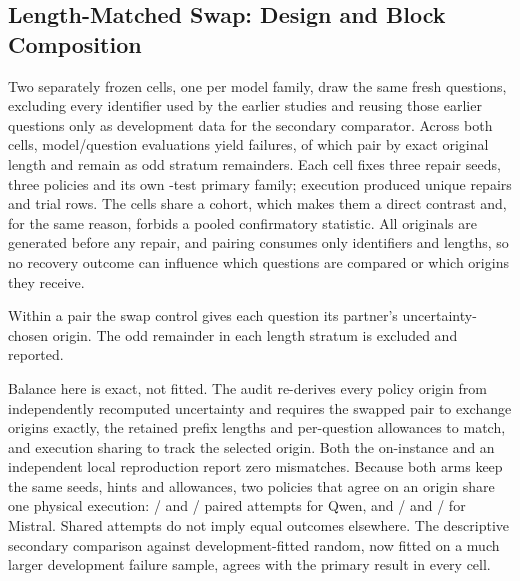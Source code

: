 \documentclass{article}
\begin{document}
\subsection{Length-Matched Swap: Design and Block Composition}
\label{app:position_pairs}
Two separately frozen cells, one per model family, draw the same \PairCohort{}
fresh questions, excluding every identifier used by the earlier studies and
reusing those earlier questions only as development data for the secondary
comparator. Across both cells, \PairQuestions{} model/question evaluations
yield \PairFailures{} failures, of which \PairMatched{} pair by exact original
length and \PairUnmatched{} remain as odd stratum remainders. Each cell fixes
three repair seeds, three policies and its own \PairFamily{}-test primary
family; execution produced \PairRepairs{} unique repairs and \PairRows{} trial
rows. The cells share a cohort, which makes them a direct contrast and, for the
same reason, forbids a pooled confirmatory statistic. All originals are
generated before any repair, and pairing consumes only identifiers and
lengths, so no recovery outcome can influence which questions are compared or
which origins they receive.

Within a pair the swap control gives each question its partner's
uncertainty-chosen origin. The odd remainder in each length stratum is
excluded and reported.

Balance here is exact, not fitted. The audit re-derives every policy origin
from independently recomputed uncertainty and requires the swapped pair to
exchange origins exactly, the retained prefix lengths and per-question
allowances to match, and execution sharing to track the selected origin. Both
the on-instance and an independent local reproduction report zero mismatches.
Because both arms keep the same seeds, hints and allowances, two policies that
agree on an origin share one physical execution:
\PairQwenHotpotShared{}/\PairQwenHotpotAttempts{} and
\PairQwenTwoWikiShared{}/\PairQwenTwoWikiAttempts{} paired attempts for Qwen,
and \PairMistralHotpotShared{}/\PairMistralHotpotAttempts{} and
\PairMistralTwoWikiShared{}/\PairMistralTwoWikiAttempts{} for Mistral. Shared
attempts do not imply equal outcomes elsewhere. The descriptive secondary
comparison against development-fitted random, now fitted on a much larger
development failure sample, agrees with the primary result in every cell.

\begin{table}[htbp]
\centering\footnotesize
\caption{Length-matched swap experiment, two model families on the same
\PairCohort{} fresh questions.
$N_f$ is the main-failure count and Pairs the number of length-matched blocks.
$U$ and $S$ are mean per-seed success percentages for uncertainty and the
swapped-origin control. $\Delta=U-S$ with a percentile interval over resampled
pairs; $p$ is an exact two-sided pair-block sign-flip test and $p_H$ its
Holm-adjusted value within the prespecified \PairFamily{}-test family.}
\label{tab:position_pairs}

\end{table}
\end{document}
